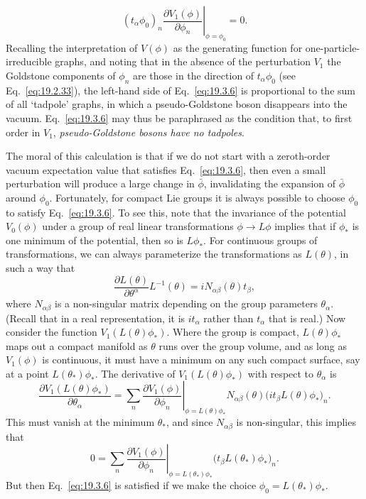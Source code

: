 \begin{equation}
\left.(t_\alpha\phi_0)_n
\frac{\partial V_1(\phi)}{\partial\phi_n}\right|_{\phi=\phi_0}=0.
\tag{19.3.6}\label{eq:19.3.6}
\end{equation}
Recalling the interpretation of $V(\phi)$ as the generating function for one-particle-irreducible graphs, and noting that in the absence of the perturbation $V_1$ the Goldstone components of $\phi_n$ are those in the direction of $t_\alpha\phi_0$ (see Eq.~\eqref{eq:19.2.33}), the left-hand side of Eq.~\eqref{eq:19.3.6} is proportional to the sum of all `tadpole' graphs, in which a pseudo-Goldstone boson disappears into the vacuum. Eq.~\eqref{eq:19.3.6} may thus be paraphrased as the condition that, to first order in $V_1$, \emph{pseudo-Goldstone bosons have no tadpoles}.

The moral of this calculation is that if we do not start with a zeroth-order vacuum expectation value that satisfies Eq.~\eqref{eq:19.3.6}, then even a small perturbation will produce a large change in $\bar\phi$, invalidating the expansion of $\bar\phi$ around $\phi_0$. Fortunately, for compact Lie groups it is always possible to choose $\phi_0$ to satisfy Eq.~\eqref{eq:19.3.6}. To see this, note that the invariance of the potential $V_0(\phi)$ under a group of real linear transformations $\phi\to L\phi$ implies that if $\phi_*$ is one minimum of the potential, then so is $L\phi_*$. For continuous groups of transformations, we can always parameterize the transformations as $L(\theta)$, in such a way that
\begin{equation}
\frac{\partial L(\theta)}{\partial\theta^\alpha}L^{-1}(\theta)
=iN_{\alpha\beta}(\theta)t_\beta,
\tag{19.3.7}\label{eq:19.3.7}
\end{equation}
where $N_{\alpha\beta}$ is a non-singular matrix depending on the group parameters $\theta_\alpha$. (Recall that in a real representation, it is $it_\alpha$ rather than $t_\alpha$ that is real.) Now consider the function $V_1(L(\theta)\phi_*)$. Where the group is compact, $L(\theta)\phi_*$ maps out a compact manifold as $\theta$ runs over the group volume, and as long as $V_1(\phi)$ is continuous, it must have a minimum on any such compact surface, say at a point $L(\theta_*)\phi_*$. The derivative of $V_1(L(\theta)\phi_*)$ with respect to $\theta_\alpha$ is
\begin{equation}
\frac{\partial V_1(L(\theta)\phi_*)}{\partial\theta_\alpha}
=\left.\sum_n\frac{\partial V_1(\phi)}{\partial\phi_n}
\right|_{\phi=L(\theta)\phi_*}
N_{\alpha\beta}(\theta)
\bigl(it_\beta L(\theta)\phi_*\bigr)_n.
\tag{19.3.8}\label{eq:19.3.8}
\end{equation}
This must vanish at the minimum $\theta_*$, and since $N_{\alpha\beta}$ is non-singular, this implies that
\begin{equation}
0=\left.\sum_n\frac{\partial V_1(\phi)}{\partial\phi_n}
\right|_{\phi=L(\theta_*)\phi_*}
\bigl(t_\beta L(\theta_*)\phi_*\bigr)_n.
\tag{19.3.9}\label{eq:19.3.9}
\end{equation}
But then Eq.~\eqref{eq:19.3.6} is satisfied if we make the choice $\phi_0=L(\theta_*)\phi_*$.

